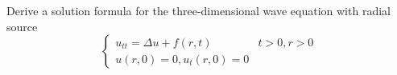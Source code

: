 Derive a solution formula for the three-dimensional wave equation with radial source
$$
\begin{cases}
  u_{tt} = \Delta u + f(r, t) & t > 0, r > 0\\
  u(r, 0) = 0, u_t(r, 0) = 0
\end{cases}
$$
